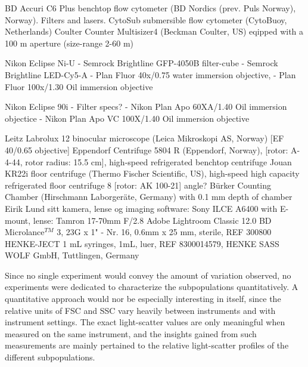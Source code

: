 
BD Accuri C6 Plus benchtop flow cytometer (BD Nordics (prev. Puls Norway), Norway). Filters and lasers.
CytoSub submersible flow cytometer (CytoBuoy, Netherlands)
Coulter Counter Multisizer4 (Beckman Coulter, US) eqipped with a 100 \micro m aperture (size-range 2-60 \micro m)

Nikon Eclipse Ni-U
- Semrock Brightline GFP-4050B filter-cube
- Semrock Brightline LED-Cy5-A
- Plan Fluor 40x/0.75 water immersion objective,
- Plan Fluor 100x/1.30 Oil immersion objective

Nikon Eclipse 90i
- Filter specs?
- Nikon Plan Apo 60XA/1.40 Oil immersion objectice
- Nikon Plan Apo VC 100X/1.40 Oil immersion objective

Leitz Labrolux 12 binocular microscope (Leica Mikroskopi AS, Norway) [EF 40/0.65 objective]
Eppendorf Centrifuge 5804 R (Eppendorf, Norway), [rotor: A-4-44, rotor radius: 15.5 cm], high-speed refrigerated benchtop centrifuge
Jouan KR22i floor centrifuge (Thermo Fischer Scientific, US), high-speed high capacity refrigerated floor centrifuge 8 [rotor: AK 100-21] angle?
Bürker Counting Chamber (Hirschmann Laborgeräte, Germany) with 0.1 mm depth of chamber
Eirik Lund sitt kamera, lense og imaging software: 
Sony ILCE A6400 with E-mount, lense: Tamron 17-70mm F/2.8 
Adobe\textsuperscript{\textregistered} Lightroom Classic 12.0 
BD Microlance$^{TM}$ 3, 23G x 1" - Nr. 16, 0.6mm x 25 mm, sterile, REF 300800
HENKE-JECT 1 mL syringes, 1mL, luer, REF 8300014579, HENKE SASS WOLF GmbH, Tuttlingen, Germany

Since no single experiment would convey the amount of variation observed, no experiments were dedicated to characterize the subpopulations quantitatively. A quantitative approach would nor be especially interesting in itself, since the relative units of FSC and SSC vary heavily between instruments and with instrument settings. The exact light-scatter values are only meaningful when measured on the same instrument, and the insights gained from such measurements are mainly pertained to the relative light-scatter profiles of the different subpopulations.